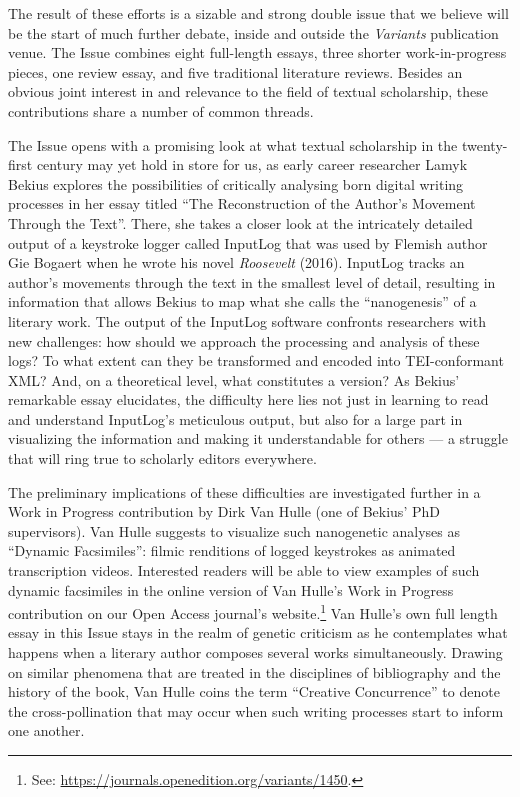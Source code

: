 \begin{preface}
The result of these efforts is a sizable and strong double issue that we believe will be the start of much further debate, inside and outside the \emph{Variants} publication venue. 
The Issue combines eight full-length essays, three shorter work-in-progress pieces, one review essay, and five traditional literature reviews. 
Besides an obvious joint interest in and relevance to the field of textual scholarship, these contributions share a number of common threads.

The Issue opens with a promising look at what textual scholarship in the twenty-first century may yet hold in store for us, as early career researcher Lamyk Bekius explores the possibilities of critically analysing born digital writing processes in her essay titled ``The Reconstruction of the Author's Movement Through the Text''. 
There, she takes a closer look at the intricately detailed output of a keystroke logger called InputLog that was used by Flemish author Gie Bogaert when he wrote his novel \emph{Roosevelt} (2016). InputLog tracks an author's movements through the text in the smallest level of detail, resulting in information that allows Bekius to map what she calls the ``nanogenesis'' of a literary work. The output of the InputLog software confronts researchers with new challenges: how should we approach the processing and analysis of these logs? To what extent can they be transformed and encoded into TEI-conformant XML? And, on a theoretical level, what constitutes a version? 
As Bekius' remarkable essay elucidates, the difficulty here lies not just in learning to read and understand InputLog's meticulous output, but also for a large part in visualizing the information and making it understandable for others --- a struggle that will ring true to scholarly editors everywhere.

The preliminary implications of these difficulties are investigated further in a Work in Progress contribution by Dirk Van Hulle (one of Bekius' PhD supervisors). Van Hulle suggests to visualize such nanogenetic analyses as ``Dynamic Facsimiles'': filmic renditions of logged keystrokes as animated transcription videos. 
Interested readers will be able to view examples of such dynamic facsimiles in the online version of Van Hulle's Work in Progress contribution on our Open Access journal's website.\footnote{See: \url{https://journals.openedition.org/variants/1450}.}
Van Hulle's own full length essay in this Issue stays in the realm of genetic criticism as he contemplates what happens when a literary author composes several works simultaneously. 
Drawing on similar phenomena that are treated in the disciplines of bibliography and the history of the book, Van Hulle coins the term ``Creative Concurrence'' to denote the cross-pollination that may occur when such writing processes start to inform one another.


\end{preface}
